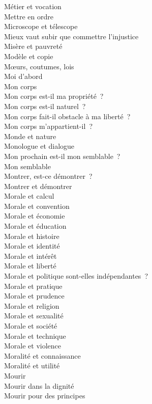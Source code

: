 \documentclass[a4paper,12pt]{article}
\begin{document}
Métier et vocation \\
Mettre en ordre \\
Microscope et télescope \\
Mieux vaut subir que commettre l'injustice \\
Misère et pauvreté \\
Modèle et copie \\
Mœurs, coutumes, lois \\
Moi d'abord \\
Mon corps \\
Mon corps est-il ma propriété ? \\
Mon corps est-il naturel ? \\
Mon corps fait-il obstacle à ma liberté ? \\
Mon corps m'appartient-il ? \\
Monde et nature \\
Monologue et dialogue \\
Mon prochain est-il mon semblable ? \\
Mon semblable \\
Montrer, est-ce démontrer ? \\
Montrer et démontrer \\
Morale et calcul \\
Morale et convention \\
Morale et économie \\
Morale et éducation \\
Morale et histoire \\
Morale et identité \\
Morale et intérêt \\
Morale et liberté \\
Morale et politique sont-elles indépendantes ? \\
Morale et pratique \\
Morale et prudence \\
Morale et religion \\
Morale et sexualité \\
Morale et société \\
Morale et technique \\
Morale et violence \\
Moralité et connaissance \\
Moralité et utilité \\
Mourir \\
Mourir dans la dignité \\
Mourir pour des principes \\
\end{document}
